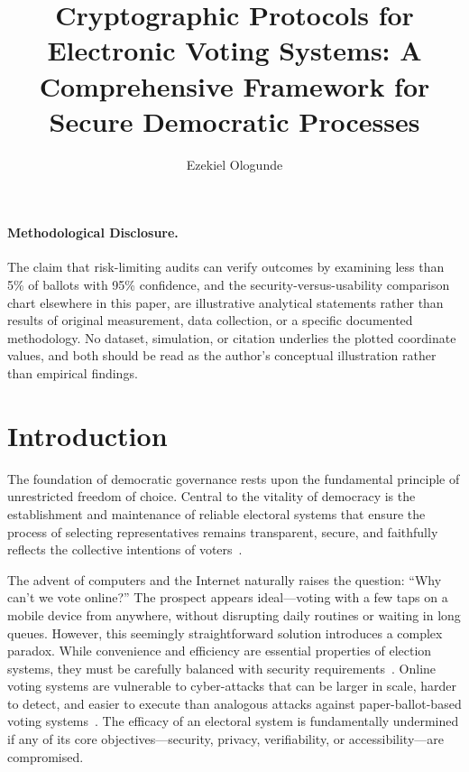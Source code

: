 \documentclass[sigconf,nonacm]{acmart}
\title{Cryptographic Protocols for Electronic Voting Systems: A Comprehensive Framework for Secure Democratic Processes}
\author{Ezekiel Ologunde}
\affiliation{\institution{Independent Researcher}\city{Boston}\state{MA}\country{USA}}
\begin{document}
\hfuzz=4pt
\maketitle

\paragraph{Methodological Disclosure.} The claim that risk-limiting audits can verify outcomes by examining less than 5\% of ballots with 95\% confidence, and the security-versus-usability comparison chart elsewhere in this paper, are illustrative analytical statements rather than results of original measurement, data collection, or a specific documented methodology. No dataset, simulation, or citation underlies the plotted coordinate values, and both should be read as the author's conceptual illustration rather than empirical findings.

\section{Introduction}

The foundation of democratic governance rests upon the fundamental principle of
unrestricted freedom of choice. Central to the vitality of democracy is the
establishment and maintenance of reliable electoral systems that ensure the process of
selecting representatives remains transparent, secure, and faithfully reflects the
collective intentions of voters~\cite{abramson1982decline}.

The advent of computers and the Internet naturally raises the question: ``Why can't we
vote online?'' The prospect appears ideal---voting with a few taps on a mobile device
from anywhere, without disrupting daily routines or waiting in long queues. However,
this seemingly straightforward solution introduces a complex paradox. While convenience
and efficiency are essential properties of election systems, they must be carefully
balanced with security requirements~\cite{brenner2017financial}. Online voting systems
are vulnerable to cyber-attacks that can be larger in scale, harder to detect, and easier
to execute than analogous attacks against paper-ballot-based voting
systems~\cite{pran2007monitoring}. The efficacy of an electoral system is fundamentally
undermined if any of its core objectives---security, privacy, verifiability, or
accessibility---are compromised.
\end{document}
